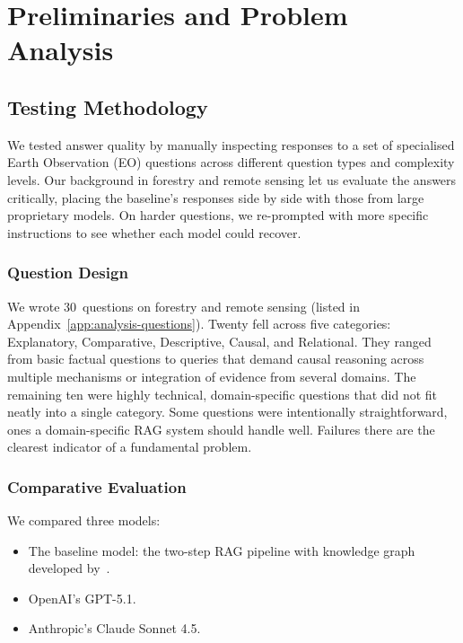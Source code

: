 \chapter{Preliminaries and Problem Analysis}
\label{chap:preliminaries}

\section{Testing Methodology}
\label{sec:testing-methodology}

We tested answer quality by manually inspecting responses to a set of specialised Earth Observation (EO) questions across different question types and complexity levels. Our background in forestry and remote sensing let us evaluate the answers critically, placing the baseline's responses side by side with those from large proprietary models. On harder questions, we re-prompted with more specific instructions to see whether each model could recover.

\subsection{Question Design}
\label{subsec:question-design}

We wrote 30~questions on forestry and remote sensing (listed in Appendix~\ref{app:analysis-questions}). Twenty fell across five categories: Explanatory, Comparative, Descriptive, Causal, and Relational. They ranged from basic factual questions to queries that demand causal reasoning across multiple mechanisms or integration of evidence from several domains. The remaining ten were highly technical, domain-specific questions that did not fit neatly into a single category. Some questions were intentionally straightforward, ones a domain-specific RAG system should handle well. Failures there are the clearest indicator of a fundamental problem.

\subsection{Comparative Evaluation}
\label{subsec:comparative-approach}

We compared three models:

\begin{itemize}
\item The baseline model: the two-step RAG pipeline with knowledge graph developed by~\citet{elbaff2025earthobservationrag}.
\item OpenAI's GPT-5.1.
\item Anthropic's Claude Sonnet 4.5.
\end{itemize}

